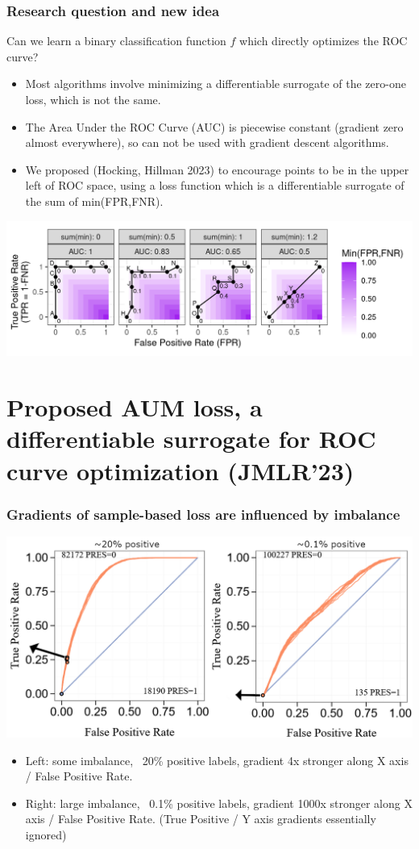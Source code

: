 \documentclass[t]{beamer}
\begin{document}
\begin{frame}
  \frametitle{Research question and new idea}
  Can we learn a binary classification function $f$ which directly
  optimizes the ROC curve?
  \begin{itemize}
  \item Most algorithms involve minimizing a differentiable surrogate
    of the zero-one loss, which is not the same.
  \item The Area Under the ROC Curve (AUC) is piecewise constant
    (gradient zero almost everywhere), so can not be used with
    gradient descent algorithms.
  \item We proposed (Hocking, Hillman 2023) to encourage points to be in the upper left of ROC
    space, using a loss function which is a differentiable surrogate
    of the sum of min(FPR,FNR).
  \end{itemize}
  \includegraphics[width=\textwidth]{figure-more-than-one-new-binary-heat}
\end{frame}
 
\section{Proposed AUM loss, a differentiable surrogate for ROC curve optimization (JMLR'23)}

\begin{frame}
  \frametitle{Gradients of sample-based loss are influenced by imbalance}
  \includegraphics[width=\textwidth]{roc-gradient-arrows}
  \begin{itemize}
  \item Left: some imbalance, ~20\% positive labels, gradient 4x
    stronger along X axis / False Positive Rate.
  \item Right: large imbalance, ~0.1\% positive labels, gradient 1000x
    stronger along X axis / False Positive Rate. (True Positive / Y
    axis gradients essentially ignored)
  \end{itemize}
\end{frame}
\end{document}

